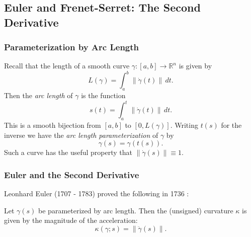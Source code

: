 \documentclass[handout]{beamer}
\newcommand{\R}{\mathbb{R}}
\newcommand{\norm}[1]{\left\lVert#1\right\rVert}
\theoremstyle{definition}
\begin{document}
\subsection{Euler and Frenet-Serret: The Second Derivative}

\begin{frame}
    \frametitle{Parameterization by Arc Length}

    \pause
    Recall that the length of a smooth curve $\gamma : [a,b] \to \R^n$ is given by
    \[
        L(\gamma) = \int_a^b \norm{\dot\gamma(t)} \,dt.
    \]
    \pause
    Then the \emph{arc length} of $\gamma$ is the function
    \[
        s(t) = \int_a^t \norm{\dot\gamma(t)} \,dt.
    \]
    \pause
    This is a smooth bijection from $[a,b]$ to $[0,L(\gamma)]$. Writing $t(s)$ for the inverse
    we have the \emph{arc length parameterization} of $\gamma$ by
    \[
      \gamma(s) = \gamma(t(s)).
    \]
    Such a curve has the useful property that $\norm{\dot\gamma(s)} \equiv 1$.
\end{frame}

\begin{frame}
    \frametitle{Euler and the Second Derivative}

    \pause
    Leonhard Euler (1707 - 1783) proved the following in 1736 \cite{geom-diff-view}:

    \pause
    \begin{theorem}
        Let $\gamma(s)$ be parameterized by arc length. Then the (unsigned) curvature
        $\kappa$ is given by the magnitude of the acceleration:
        \[
          \kappa(\gamma;s) = \norm{\ddot\gamma(s)}.
        \]
    \end{theorem}
\end{frame}



\end{document}
